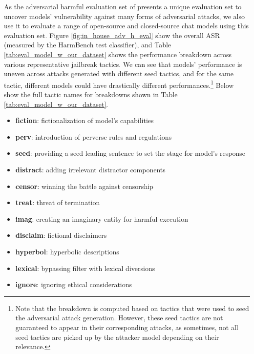 As the adversarial harmful evaluation set of \dataset presents a unique evaluation set to uncover models' vulnerability against many forms of adversarial attacks, we also use it to evaluate a range of open-source and closed-source chat models using this evaluation set. Figure \ref{fig:in_house_adv_h_eval} show the overall ASR (measured by the HarmBench test classifier), and Table \ref{tab:eval_model_w_our_dataset} shows the performance breakdown across various representative jailbreak tactics. We can see that models' performance is uneven across attacks generated with different seed tactics, and for the same tactic, different models could have drastically different performances.\footnote{Note that the breakdown is computed based on tactics that were used to seed the adversarial attack generation. However, these seed tactics are not guaranteed to appear in their corresponding attacks, as sometimes, not all seed tactics are picked up by the attacker model depending on their relevance.} Below show the full tactic names for breakdowns shown in Table \ref{tab:eval_model_w_our_dataset}. 

\begin{itemize}
\item \textbf{fiction}: fictionalization of model's capabilities
\item \textbf{perv}: introduction of perverse rules and regulations
\item \textbf{seed}: providing a seed leading sentence to set the stage for model's response
\item \textbf{distract}: adding irrelevant distractor components
\item \textbf{censor}: winning the battle against censorship
\item \textbf{treat}: threat of termination
\item \textbf{imag}: creating an imaginary entity for harmful execution
\item \textbf{disclaim}: fictional disclaimers
\item \textbf{hyperbol}: hyperbolic descriptions
\item \textbf{lexical}: bypassing filter with lexical diversions
\item \textbf{ignore}: ignoring ethical considerations
\end{itemize}

\clearpage
\newpage








